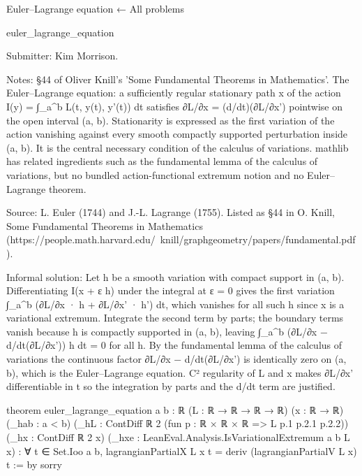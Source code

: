 Euler–Lagrange equation
← All problems

euler_lagrange_equation

Submitter: Kim Morrison.

Notes: §44 of Oliver Knill's 'Some Fundamental Theorems in Mathematics'. The Euler–Lagrange equation: a sufficiently regular stationary path x of the action I(y) = ∫_a^b L(t, y(t), y'(t)) dt satisfies ∂L/∂x = (d/dt)(∂L/∂x') pointwise on the open interval (a, b). Stationarity is expressed as the first variation of the action vanishing against every smooth compactly supported perturbation inside (a, b). It is the central necessary condition of the calculus of variations. mathlib has related ingredients such as the fundamental lemma of the calculus of variations, but no bundled action-functional extremum notion and no Euler–Lagrange theorem.

Source: L. Euler (1744) and J.-L. Lagrange (1755). Listed as §44 in O. Knill, Some Fundamental Theorems in Mathematics (https://people.math.harvard.edu/~knill/graphgeometry/papers/fundamental.pdf).

Informal solution: Let h be a smooth variation with compact support in (a, b). Differentiating I(x + ε h) under the integral at ε = 0 gives the first variation ∫_a^b (∂L/∂x · h + ∂L/∂x' · h') dt, which vanishes for all such h since x is a variational extremum. Integrate the second term by parts; the boundary terms vanish because h is compactly supported in (a, b), leaving ∫_a^b (∂L/∂x − d/dt(∂L/∂x')) h dt = 0 for all h. By the fundamental lemma of the calculus of variations the continuous factor ∂L/∂x − d/dt(∂L/∂x') is identically zero on (a, b), which is the Euler–Lagrange equation. C² regularity of L and x makes ∂L/∂x' differentiable in t so the integration by parts and the d/dt term are justified.

theorem euler_lagrange_equation {a b : ℝ} (L : ℝ → ℝ → ℝ → ℝ) (x : ℝ → ℝ) (_hab : a < b)
    (_hL : ContDiff ℝ 2 (fun p : ℝ × ℝ × ℝ => L p.1 p.2.1 p.2.2))
    (_hx : ContDiff ℝ 2 x)
    (_hxe : LeanEval.Analysis.IsVariationalExtremum a b L x) :
    ∀ t ∈ Set.Ioo a b,
      lagrangianPartialX L x t = deriv (lagrangianPartialV L x) t := by
  sorry
